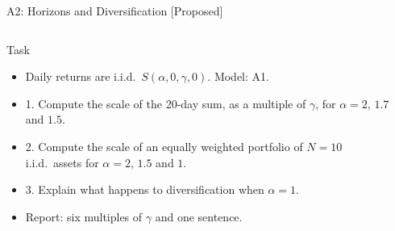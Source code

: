\begin{frame}{A2: Horizons and Diversification [Proposed]}
\propsub
\itemsize{\footnotesize}
\begin{columns}[T]
\begin{column}{\taskw}
\begin{block}{Task}
\begin{itemize}
    \item Daily returns are i.i.d.\ $S(\alpha, 0, \gamma, 0)$. Model: A1.
    \item 1. Compute the scale of the 20-day sum, as a multiple of $\gamma$, for $\alpha = 2$, $1.7$ and $1.5$.
    \item 2. Compute the scale of an equally weighted portfolio of $N = 10$ i.i.d.\ assets for $\alpha = 2$, $1.5$ and $1$.
    \item 3. Explain what happens to diversification when $\alpha = 1$.
    \item Report: six multiples of $\gamma$ and one sentence.
\end{itemize}
\end{block}
\end{column}
\begin{column}{\solw}
\end{column}
\end{columns}
\end{frame}

